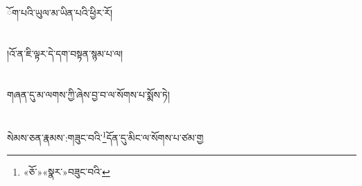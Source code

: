 ོག་པའི་ཡུལ་མ་ཡིན་པའི་ཕྱིར་རོ།\chapter{ }།འོ་ན་ཇི་ལྟར་དེ་དག་བསྟན་སྙམ་པ་ལ།\chapter{ }གཞན་དུ་མ་ལགས་ཀྱི་ཞེས་བྱ་བ་ལ་སོགས་པ་སྨོས་ཏེ།\chapter{ }སེམས་ཅན་རྣམས་:གཟུང་བའི་\footnote{«ཅོ་»«སྣར་»བཟུང་བའི་}དོན་དུ་མིང་ལ་སོགས་པ་ཙམ་གྱ
